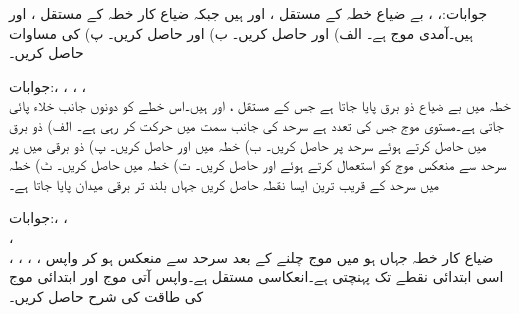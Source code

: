 جوابات:، ، 
بے ضیاع خطہ  کے مستقل ،  اور  ہیں جبکہ ضیاع کار خطہ  کے مستقل ،  اور  ہیں۔آمدی موج  ہے۔ الف)  اور  حاصل کریں۔ ب)  اور
  حاصل کریں۔ پ)  کی مساوات حاصل کریں۔

جوابات:، ، ، ،\\
خطہ  میں بے ضیاع ذو برق پایا جاتا ہے جس  کے مستقل ،  اور  ہیں۔اس خطے کو دونوں جانب خلاء پائی جاتی ہے۔مستوی موج جس کی تعدد  ہے سرحد  کی جانب  سمت میں حرکت کر رہی ہے۔ الف)  ذو برق میں  حاصل کرتے ہوئے سرحد  پر  حاصل کریں۔ ب) خطہ  میں  اور  حاصل کریں۔ پ) ذو برقی میں  پر سرحد سے منعکس موج کو استعمال کرتے ہوئے  اور  حاصل کریں۔ ت) خطہ  میں  حاصل کریں۔ ٹ) خطہ  میں سرحد کے قریب ترین ایسا نقطہ حاصل کریں جہاں بلند تر برقی میدان پایا جاتا ہے۔ 

جوابات:، ، \\ ، \\ ، ، ، ، 
ضیاع کار خطہ جہاں  ہو میں موج  چلنے کے بعد سرحد سے منعکس ہو کر واپس اسی ابتدائی نقطے تک پہنچتی ہے۔انعکاسی مستقل  ہے۔واپس آتی موج اور ابتدائی موج کی طاقت کی شرح حاصل کریں۔


